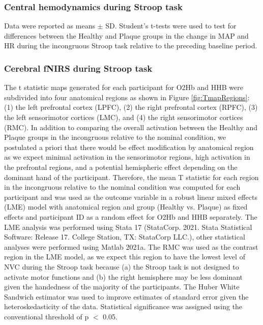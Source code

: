 \documentclass[12pt]{spieman}  %
\begin{document}
\begin{spacing}{2}
\subsubsection{Central hemodynamics during Stroop task}
Data were reported as means $\pm$ SD. Student's t-tests were used to test for differences between the Healthy and Plaque groups in the change in MAP and HR during the incongruous Stroop task relative to the preceding baseline period. 

\subsubsection{Cerebral fNIRS during Stroop task}
The t statistic maps generated for each participant for O2Hb and HHB were subdivided into four anatomical regions as shown in Figure \ref{fig:TmapRegions}: (1) the left prefrontal cortex (LPFC), (2) the right prefrontal cortex (RPFC), (3) the left sensorimotor cortices (LMC), and (4) the right sensorimotor cortices (RMC). In addition to comparing the overall activation between the Healthy and Plaque groups in the incongruous relative to the nominal condition, we postulated a priori that there would be effect modification by anatomical region as we expect minimal activation in the sensorimotor regions, high activation in the prefrontal regions, and a potential hemispheric effect depending on the dominant hand of the participant.  Therefore, the mean T statistic for each region in the incongruous relative to the nominal condition was computed for each participant and was used as the outcome variable in a robust linear mixed effects (LME) model with anatomical region and group (Healthy vs. Plaque) as fixed effects and participant ID as a random effect for O2Hb and HHB separately. The LME analysis was performed using Stata 17 (StataCorp. 2021. Stata Statistical Software: Release 17. College Station, TX: StataCorp LLC.), other statistical analyses were performed using Matlab 2021a. The RMC was used as the contrast region in the LME model, as we expect this region to have the lowest level of NVC during the Stroop task because (a) the Stroop task is not designed to activate motor functions and (b) the right hemisphere may be less dominant given the handedness of the majority of the participants. The Huber White Sandwich estimator was used to improve estimates of standard error given the heteroskedasticity of the data. Statistical significance was assigned using the conventional threshold of p $<$ 0.05. 



\end{spacing}
\end{document}

